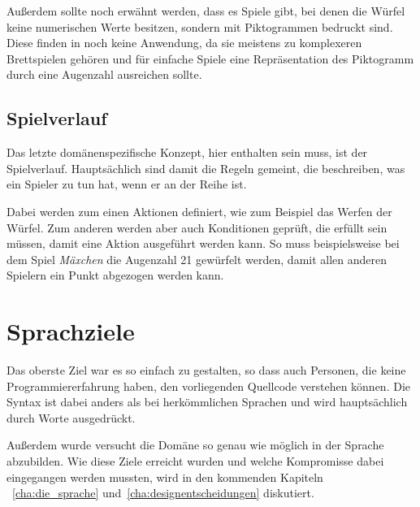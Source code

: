 		Außerdem sollte noch erwähnt werden, dass es Spiele gibt, bei denen die Würfel keine numerischen Werte besitzen, sondern mit Piktogrammen bedruckt sind. Diese finden in \dg noch keine Anwendung, da sie meistens zu komplexeren Brettspielen gehören und für einfache Spiele eine Repräsentation des Piktogramm durch eine Augenzahl ausreichen sollte.

	\subsection{Spielverlauf}
	\label{sub:spielverlauf}
		Das letzte domänenspezifische Konzept, hier enthalten sein muss, ist der Spielverlauf. Hauptsächlich sind damit die Regeln gemeint, die beschreiben, was ein Spieler zu tun hat, wenn er an der Reihe ist.

		Dabei werden zum einen Aktionen definiert, wie zum Beispiel das Werfen der Würfel. Zum anderen werden aber auch Konditionen geprüft, die erfüllt sein müssen, damit eine Aktion ausgeführt werden kann. So muss beispielsweise bei dem Spiel \emph{Mäxchen} die Augenzahl 21 gewürfelt werden, damit allen anderen Spielern ein Punkt abgezogen werden kann.

\section{Sprachziele}
\label{sec:sprachziele}
	Das oberste Ziel war es \dg so einfach zu gestalten, so dass auch Personen, die keine Programmiererfahrung haben, den vorliegenden Quellcode verstehen können. Die Syntax ist dabei anders als bei herkömmlichen Sprachen und wird hauptsächlich durch Worte ausgedrückt.

	Außerdem wurde versucht die Domäne so genau wie möglich in der Sprache abzubilden. Wie diese Ziele erreicht wurden und welche Kompromisse dabei eingegangen werden mussten, wird in den kommenden Kapiteln ~\ref{cha:die_sprache} und~\ref{cha:designentscheidungen} diskutiert.